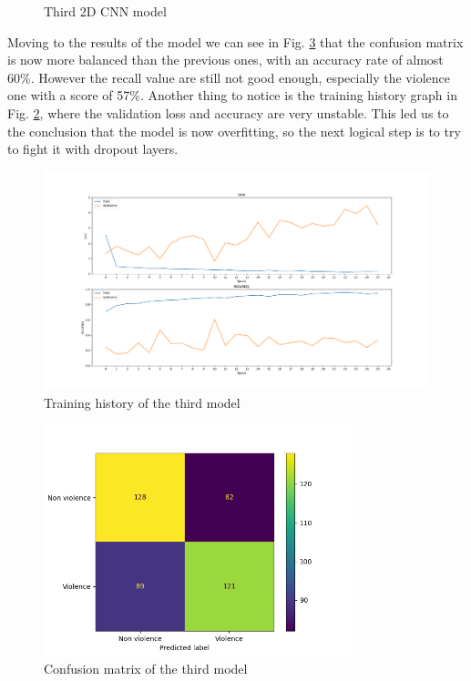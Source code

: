 \begin{figure}[]
    \caption{Third 2D CNN model}
    \label{fig:Third2DCNN}
\end{figure}

Moving to the results of the model we can see in Fig. \ref{fig:Third2DCNNMatrix} that the confusion matrix is now more balanced than the previous ones, with an accuracy rate of almost 60\%. However the recall value are still not good enough, especially the violence one with a score of 57\%. Another thing to notice is the training history graph in Fig. \ref{fig:Third2DCNNHistory}, where the validation loss and accuracy are very unstable. This led us to the conclusion that the model is now overfitting, so the next logical step is to try to fight it with dropout layers.
\begin{figure}[]
    \centering
    \includegraphics[width=1\textwidth]{images/731a-simple3augConv8_64Dense128_64nozoom-b538-history.png}
    \caption{Training history of the third model}
    \label{fig:Third2DCNNHistory}
\end{figure}
\begin{figure}[]
    \centering
    \includegraphics[width=0.8\textwidth]{images/731a-simple3augConv8_64Dense128_64nozoom-b538-conf_matrix.png}
    \caption{Confusion matrix of the third model}
    \label{fig:Third2DCNNMatrix}
\end{figure}
\pagebreak
